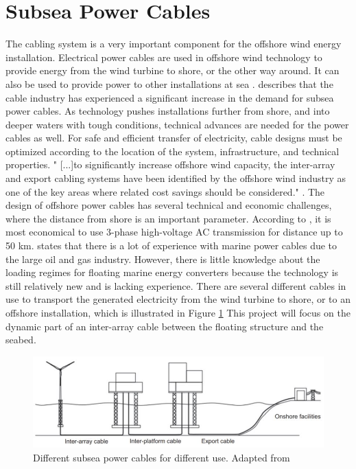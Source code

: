 \section{Subsea Power Cables}
 The cabling system is a very important component for the offshore wind energy installation. Electrical power cables are used in offshore wind technology to provide energy from the wind turbine to shore, or the other way around. It can also be used to provide power to other installations at sea \cite{Nasution2013}.  \cite{srinil2016} describes that the cable industry has experienced a significant increase in the demand for subsea power cables. As technology pushes installations further from shore, and into deeper waters with tough conditions, technical advances are needed for the power cables as well. For safe and efficient transfer of electricity, cable designs must be optimized according to the location of the system, infrastructure, and technical properties. " [...]to significantly increase offshore wind capacity, the inter-array and export cabling systems have been identified by the offshore wind industry as one of the key areas where related cost savings should be considered."  \cite{srinil2016}. The design of offshore power cables has several technical and economic challenges, where the distance from shore is an important parameter. According to \cite{Lynn2011}, it is most economical to use 3-phase high-voltage AC transmission for distance up to 50 km.\newline
 \newline
 \cite{Thies2012} states that there is a lot of experience with marine power cables due to the large oil and gas industry. However, there is little knowledge about the loading regimes for floating marine energy converters because the technology is still relatively new and is lacking experience. 
 \newline
 \newline
 There are several different cables in use to transport the generated electricity from the wind turbine to shore, or to an offshore installation, which is illustrated in Figure \ref{fig:diffcable} This project will focus on the dynamic part of an inter-array cable between the floating structure and the seabed. 
 
 \begin{figure}[H]
\centering
\includegraphics[scale=0.8]{figures/diffcable}
\caption[$\; \:$Different subsea power cable]{Different subsea power cables for different use. Adapted from   \cite{srinil2016} }
 \label{fig:diffcable}
\end{figure}


